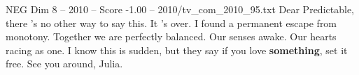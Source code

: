 \begin{textsample}{NEG Dim 8 – 2010 – Score -1.00 – 2010/tv\_com\_2010\_95.txt}  \label{ex:f8_neg_050}
Dear Predictable, there 's no other way to say this.
It 's over.
I found a permanent escape from monotony.
Together we are perfectly balanced.
Our senses awake.
Our hearts racing as one.
I know this is sudden, but they say if you love \textbf{something}, set it free.
See you around, Julia.

\end{textsample}
